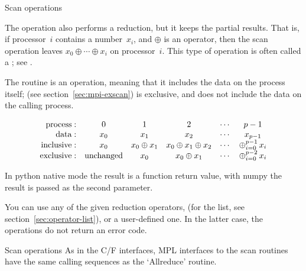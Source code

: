
 {Scan operations}
\label{sec:scan}

The  operation also performs a reduction, but it keeps 
the partial results. That is, if processor~$i$ contains a number~$x_i$, 
and $\oplus$ is an operator,
then the scan operation leaves $x_0\oplus\cdots\oplus x_i$ on processor~$i$.
This type of operation is often called a ;
see .

The  routine is an  operation,
meaning that it includes the data on the process itself;
 (see section~\ref{sec:mpi-exscan})
is exclusive, and does not include the data on the calling process.

\[
\begin{array}{rccccc}
  \mathrm{process:}
      &0&1&2&\cdots&p-1\\
  \mathrm{data:}
      &x_0&x_1&x_2&\cdots&x_{p-1}\\
  \mathrm{inclusive:}\mathstrut
      &x_0&x_0\oplus x_1&x_0\oplus x_1\oplus x_2&\cdots&\mathop\oplus_{i=0}^{p-1} x_i\\
  \mathrm{exclusive:}\mathstrut
      &\mathrm{unchanged}&x_0&x_0\oplus x_1&\cdots&\mathop\oplus_{i=0}^{p-2} x_i\\
\end{array}
\]


In python native mode the result is a function return value,
with numpy the result is passed as the second parameter.
%

You can use any of the given reduction operators,
  (for the list, see section~\ref{sec:operator-list}),
or a user-defined one. In the latter case,
the  operations do not return an error code.

\begin{mplnote}{Scan operations}
  As in the C/F interfaces, \ac{MPL} interfaces to the scan routines
  have the same calling sequences as the `Allreduce' routine.
\end{mplnote}

